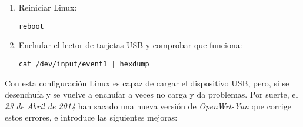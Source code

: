 \begin{enumerate}
    \item Reiniciar Linux:

        \begin{lstlisting}
reboot
        \end{lstlisting}

    \item Enchufar el lector de tarjetas USB y comprobar que funciona:

        \begin{lstlisting}
cat /dev/input/event1 | hexdump
        \end{lstlisting}

\end{enumerate}

Con esta configuración Linux es capaz de cargar el dispositivo USB, pero, si se desenchufa y se vuelve a enchufar a veces no carga y da problemas. Por suerte, el \emph{23 de Abril de 2014} han sacado una nueva versión de \emph{OpenWrt-Yun} que corrige estos errores, e introduce las siguientes mejoras:

